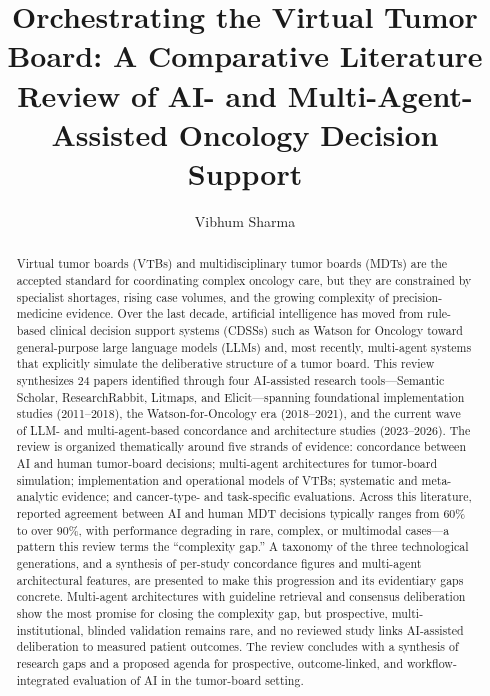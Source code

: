 \documentclass[acmsmall,screen=true,review=false,nonacm=true]{acmart}
\begin{document}
\title{Orchestrating the Virtual Tumor Board: A Comparative Literature Review of AI- and Multi-Agent-Assisted Oncology Decision Support}

\author{Vibhum Sharma}

\renewcommand{\shortauthors}{Sharma}

\begin{abstract}
Virtual tumor boards (VTBs) and multidisciplinary tumor boards (MDTs) are the accepted standard for coordinating complex oncology care, but they are constrained by specialist shortages, rising case volumes, and the growing complexity of precision-medicine evidence. Over the last decade, artificial intelligence has moved from rule-based clinical decision support systems (CDSSs) such as Watson for Oncology toward general-purpose large language models (LLMs) and, most recently, multi-agent systems that explicitly simulate the deliberative structure of a tumor board. This review synthesizes 24 papers identified through four AI-assisted research tools---Semantic Scholar, ResearchRabbit, Litmaps, and Elicit---spanning foundational implementation studies (2011--2018), the Watson-for-Oncology era (2018--2021), and the current wave of LLM- and multi-agent-based concordance and architecture studies (2023--2026). The review is organized thematically around five strands of evidence: concordance between AI and human tumor-board decisions; multi-agent architectures for tumor-board simulation; implementation and operational models of VTBs; systematic and meta-analytic evidence; and cancer-type- and task-specific evaluations. Across this literature, reported agreement between AI and human MDT decisions typically ranges from 60\% to over 90\%, with performance degrading in rare, complex, or multimodal cases---a pattern this review terms the ``complexity gap.'' A taxonomy of the three technological generations, and a synthesis of per-study concordance figures and multi-agent architectural features, are presented to make this progression and its evidentiary gaps concrete. Multi-agent architectures with guideline retrieval and consensus deliberation show the most promise for closing the complexity gap, but prospective, multi-institutional, blinded validation remains rare, and no reviewed study links AI-assisted deliberation to measured patient outcomes. The review concludes with a synthesis of research gaps and a proposed agenda for prospective, outcome-linked, and workflow-integrated evaluation of AI in the tumor-board setting.
\end{abstract}
\end{document}
